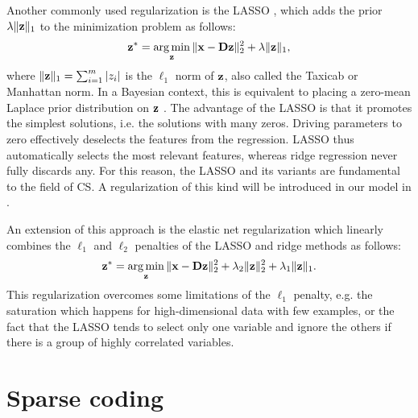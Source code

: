 Another commonly used regularization is the \gls{LASSO} \cite{tibshirani1996Lasso}, which adds the prior $\lambda \| \mathbf{z} \|_1$ to the minimization problem  as follows:
\begin{equation} \label{eqn:lasso_regularization}
	\mathbf{z}^* = \operatorname*{arg\,min}\limits_{\mathbf{z}} \| \mathbf{x} - \mathbf{D}\mathbf{z} \|_2^2 + \lambda \| \mathbf{z} \|_1,
\end{equation}
where $\| \mathbf{z} \|_1 = \sum_{i=1}^{m} |z_i|$ is the $\ell_1$ norm of $\mathbf{z}$, also called the Taxicab or Manhattan norm.
In a Bayesian context, this is equivalent to placing a zero-mean Laplace prior distribution on $\mathbf{z}$ \cite{park2008BayesianLasso}. The advantage of the \gls{LASSO} is that it promotes the simplest solutions, i.e. the solutions with many zeros. Driving parameters to zero effectively deselects the features from the regression. \gls{LASSO} thus automatically selects the most relevant features, whereas ridge regression never fully discards any. For this reason, the \gls{LASSO} and its variants are fundamental to the field of \gls{CS}. A regularization of this kind will be introduced in our model in .

An extension of this approach is the elastic net regularization \cite{zou2005ElasticNet} which linearly combines the $\ell_1$ and $\ell_2$ penalties of the \gls{LASSO} and ridge methods as follows:
\begin{equation} \label{eqn:elasticnet_regularization}
	\mathbf{z}^* = \operatorname*{arg\,min}\limits_{\mathbf{z}} \| \mathbf{x} - \mathbf{D}\mathbf{z} \|_2^2 + \lambda_2 \| \mathbf{z} \|_2^2 + \lambda_1 \| \mathbf{z} \|_1.
\end{equation}
This regularization overcomes some limitations of the $\ell_1$ penalty, e.g. the saturation which happens for high-dimensional data with few examples, or the fact that the \gls{LASSO} tends to select only one variable and ignore the others if there is a group of highly correlated variables.

\section{Sparse coding} \label{sec:sparse_coding}

